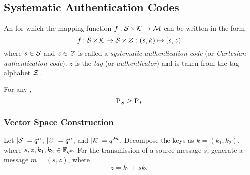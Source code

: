 \subsection{Systematic Authentication Codes}\label{subsec:Systematic_Authentication_Codes}
\begin{definition}\label{def:Systematic_Authentication_Code}
  An  for which the mapping function $f : \operatorname{\mathcal{S}} \times \operatorname{\mathcal{K}} \rightarrow \operatorname{\mathcal{M}}$ can be written in the form
  \begin{equation}\label{eq:Systematic_Authentication_Codes}
    f : \operatorname{\mathcal{S}} \times \operatorname{\mathcal{K}} \rightarrow \operatorname{\mathcal{S}} \times \operatorname{\mathcal{Z}} : (s, k) \mapsto (s, z)
  \end{equation}
  where $s \in \operatorname{\mathcal{S}}$ and $z \in \operatorname{\mathcal{Z}}$ is called a \emph{systematic authentication code} (or \emph{Cartesian authentication code}).
  $z$ is the \emph{tag} (or \emph{authenticator}) and is taken from the tag alphabet $\operatorname{\mathcal{Z}}$.
\end{definition}

\begin{theorem}\label{thm:Bounds_Systematic_Authentication_Code}
  For any ,
  \begin{equation}\label{eq:Bounds_Systematic_Authentication_Code}
    \operatorname{\operatorname{P}}_{S} \geq \operatorname{\operatorname{P}}_{I}
  \end{equation}
\end{theorem}

\subsubsection{Vector Space Construction}\label{subsubsec:Systematic_Authentication_Code-Vector_Space}
Let $\lvert \operatorname{\mathcal{S}} \rvert = q^{n}$, $\lvert \operatorname{\mathcal{Z}} \rvert = q^{n}$, and $\lvert \operatorname{\mathcal{K}} \rvert = q^{2n}$.
Decompose the keys as $k = (k_{1}, k_{2})$, where $s, z, k_{1}, k_{2} \in \mathbb{F}_{q^{m}}$
For the transmission of a source message $s$, generate a message $m = (s, z)$, where
\begin{equation*}
  z = k_{1} + sk_{2}
\end{equation*}

